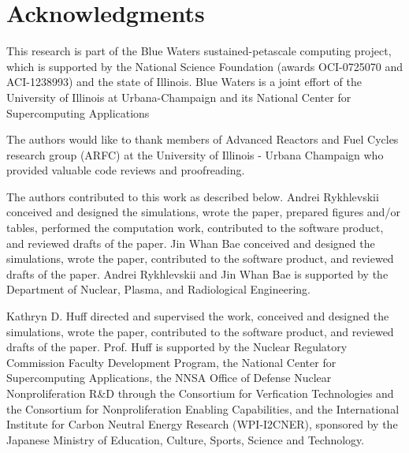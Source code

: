 \section{Acknowledgments}

This research is part of the Blue Waters sustained-petascale computing project, 
which is supported by the National Science Foundation (awards OCI-0725070 and 
ACI-1238993) and the state of Illinois. Blue Waters is a joint effort of the 
University of Illinois at Urbana-Champaign and its National Center for 
Supercomputing Applications 

The authors would like to thank  members of Advanced Reactors and Fuel Cycles
research group (ARFC) at the University of Illinois - Urbana Champaign who 
provided valuable code reviews and proofreading.

The authors contributed to this work as described below.  Andrei Rykhlevskii 
conceived and designed the simulations, wrote the paper, prepared figures 
and/or tables, performed the computation work, contributed to the software 
product, and reviewed drafts of the paper. Jin Whan Bae conceived and designed 
the simulations, wrote the paper, contributed to the software 
product, and reviewed drafts of the paper. Andrei Rykhlevskii and Jin Whan Bae 
is supported by the Department of Nuclear, Plasma, and Radiological Engineering.

Kathryn D. Huff directed and 
supervised the work, conceived and designed the simulations, wrote the paper, 
contributed to the software product, and reviewed drafts of the paper.  Prof. 
Huff is supported by the Nuclear Regulatory Commission Faculty Development 
Program, the National Center for Supercomputing Applications, the NNSA Office 
of Defense Nuclear Nonproliferation R\&D through the Consortium for Verfication 
Technologies and the Consortium for Nonproliferation Enabling Capabilities, and 
the International Institute for Carbon Neutral Energy Research (WPI-I2CNER), 
sponsored by the Japanese Ministry of Education, Culture, Sports, Science and 
Technology.

